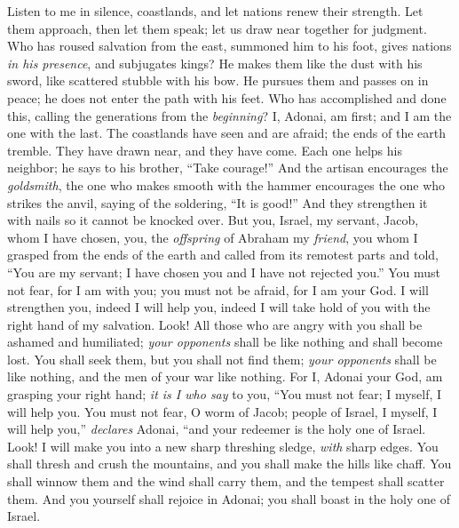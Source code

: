 \begin{biblechapter} %
 Listen to me in silence, coastlands, 
and let nations renew their strength. 
Let them approach, then let them speak; 
let us draw near together for judgment.
\verse Who has roused salvation from the east, 
summoned him to his foot, 
gives nations \textit{in his presence}, 
and subjugates kings? 
He makes them like the dust with his sword, 
like scattered stubble with his bow.
\verse He pursues them and passes on in peace; 
he does not enter the path with his feet.
\verse Who has accomplished and done this, 
calling the generations from the \textit{beginning}? 
I, Adonai, am first; 
and I am the one with the last.
\verse The coastlands have seen and are afraid; 
the ends of the earth tremble. 
They have drawn near, 
and they have come.
\verse Each one helps his neighbor; 
he says to his brother, “Take courage!”
\verse And the artisan encourages the \textit{goldsmith}, 
the one who makes smooth with the hammer encourages the one who strikes the anvil, 
saying of the soldering, “It is good!” 
And they strengthen it with nails so it cannot be knocked over.
\verse But you, Israel, my servant, Jacob, whom I have chosen, 
you, the \textit{offspring} of Abraham my \textit{friend},
\verse you whom I grasped from the ends of the earth 
and called from its remotest parts 
and told, “You are my servant; 
I have chosen you and I have not rejected you.”
\verse You must not fear, for I am with you; 
you must not be afraid, for I am your God. 
I will strengthen you, indeed I will help you, 
indeed I will take hold of you with the right hand of my salvation.
\verse Look! All those who are angry with you shall be ashamed and humiliated; 
\textit{your opponents} shall be like nothing and shall become lost.
\verse You shall seek them, 
but you shall not find them; 
\textit{your opponents} shall be like nothing, 
and the men of your war like nothing.
\verse For I, Adonai your God, am grasping your right hand; 
\textit{it is I who say} to you, 
“You must not fear; 
I myself, I will help you.
\verse You must not fear, O worm of Jacob; 
people of Israel, 
I myself, I will help you,” \textit{declares} Adonai, 
“and your redeemer is the holy one of Israel.
\verse Look! I will make you into a new sharp threshing sledge, 
\textit{with} sharp edges. 
You shall thresh and crush the mountains, 
and you shall make the hills like chaff.
\verse You shall winnow them and the wind shall carry them, 
and the tempest shall scatter them. 
And you yourself shall rejoice in Adonai; 
you shall boast in the holy one of Israel.

\end{biblechapter}
